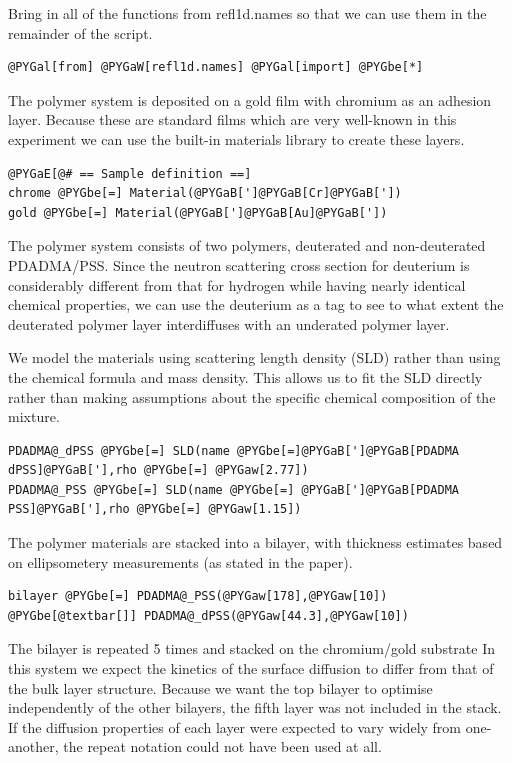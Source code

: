 \documentclass[letterpaper,10pt,english]{sphinxmanual}
\begin{document}
Bring in all of the functions from refl1d.names so that we can use them
in the remainder of the script.

\begin{Verbatim}[commandchars=@\[\]]
@PYGal[from] @PYGaW[refl1d.names] @PYGal[import] @PYGbe[*]
\end{Verbatim}

The polymer system is deposited on a gold film with chromium as an
adhesion layer. Because these are standard films which are very well-known
in this experiment we can use the built-in materials library to create
these layers.

\begin{Verbatim}[commandchars=@\[\]]
@PYGaE[@# == Sample definition ==]
chrome @PYGbe[=] Material(@PYGaB[']@PYGaB[Cr]@PYGaB['])
gold @PYGbe[=] Material(@PYGaB[']@PYGaB[Au]@PYGaB['])
\end{Verbatim}

The polymer system consists of two polymers, deuterated and non-deuterated
PDADMA/PSS.  Since the neutron scattering cross section for deuterium is
considerably different from that for hydrogen while having nearly identical
chemical properties, we can use the deuterium as a tag to see to what
extent the deuterated polymer layer interdiffuses with an underated polymer
layer.

We model the materials using scattering length density (SLD) rather than using
the chemical formula and mass density.  This allows us to fit the SLD directly
rather than making assumptions about the specific chemical composition of the
mixture.

\begin{Verbatim}[commandchars=@\[\]]
PDADMA@_dPSS @PYGbe[=] SLD(name @PYGbe[=]@PYGaB[']@PYGaB[PDADMA dPSS]@PYGaB['],rho @PYGbe[=] @PYGaw[2.77])
PDADMA@_PSS @PYGbe[=] SLD(name @PYGbe[=] @PYGaB[']@PYGaB[PDADMA PSS]@PYGaB['],rho @PYGbe[=] @PYGaw[1.15])
\end{Verbatim}

The polymer materials are stacked into a bilayer, with thickness
estimates based on ellipsometery measurements (as stated in the paper).

\begin{Verbatim}[commandchars=@\[\]]
bilayer @PYGbe[=] PDADMA@_PSS(@PYGaw[178],@PYGaw[10]) @PYGbe[@textbar[]] PDADMA@_dPSS(@PYGaw[44.3],@PYGaw[10])
\end{Verbatim}

The bilayer is repeated 5 times and stacked on the chromium/gold substrate
In this system we expect the kinetics of the surface diffusion to differ
from that of the bulk layer structure. Because we want the top bilayer to
optimise independently of the other bilayers, the fifth layer was not
included in the stack. If the diffusion properties of each layer were
expected to vary widely from one-another, the repeat notation could not
have been used at all.
\end{document}
